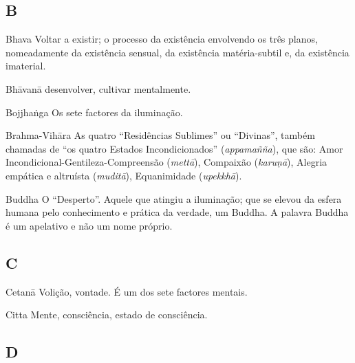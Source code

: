 \subsection{B}

\begin{glossarydescription}

\item[Bhava] Voltar a existir; o processo da existência envolvendo os três planos, nomeadamente da existência sensual, da existência matéria-subtil e, da existência imaterial.

\item[Bhāvanā] desenvolver, cultivar mentalmente.

\item[Bojjhaṅga] Os sete factores da iluminação.

\item[Brahma-Vihāra] As quatro ``Residências Sublimes'' ou ``Divinas'', também
chamadas de ``os quatro Estados Incondicionados'' (\emph{appamañña}), que são:
Amor Incondicional-Gentileza-Compreensão (\emph{mettā}), Compaixão
(\emph{karuṇā}), Alegria empática e altruísta (\emph{muditā}), Equanimidade
(\emph{upekkhā}).

\item[Buddha] O ``Desperto''. Aquele que atingiu a iluminação; que se elevou da
esfera humana pelo conhecimento e prática da verdade, um Buddha. A palavra
Buddha é um apelativo e não um nome próprio.

\end{glossarydescription}

\subsection{C}

\begin{glossarydescription}

\item[Cetanā] Volição, vontade. É um dos sete factores mentais.

\item[Citta] Mente, consciência, estado de consciência.

\end{glossarydescription}

\subsection{D}


